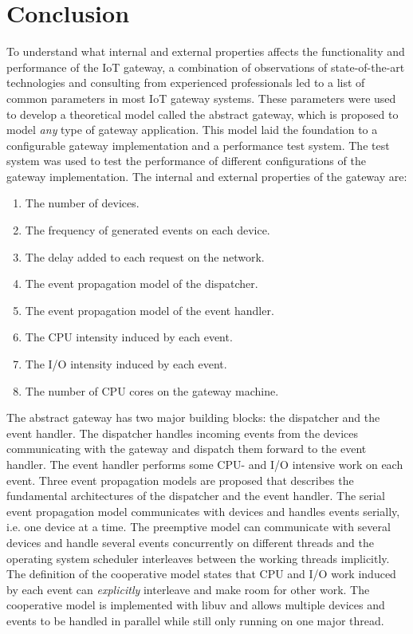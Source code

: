 \chapter{Conclusion}
\label{cha:conclusion}

To understand what internal and external properties affects the functionality
and performance of the IoT gateway, a combination of observations of
state-of-the-art technologies and consulting from experienced professionals led
to a list of common parameters in most IoT gateway systems. These parameters
were used to develop a theoretical model called the abstract gateway, which is
proposed to model \textit{any} type of gateway application. This model laid the
foundation to a configurable gateway implementation and a performance test
system. The test system was used to test the performance of different
configurations of the gateway implementation. The internal and external
properties of the gateway are:

\begin{enumerate}

    \item The number of devices.
    \item The frequency of generated events on each device.
    \item The delay added to each request on the network.
    \item The event propagation model of the dispatcher.
    \item The event propagation model of the event handler.
    \item The CPU intensity induced by each event.
    \item The I/O intensity induced by each event.
    \item The number of CPU cores on the gateway machine.

\end{enumerate}

The abstract gateway has two major building blocks: the dispatcher and the
event handler. The dispatcher handles incoming events from the devices
communicating with the gateway and dispatch them forward to the event handler.
The event handler performs some CPU- and I/O intensive work on each event.
Three event propagation models are proposed that describes the fundamental
architectures of the dispatcher and the event handler. The serial event
propagation model communicates with devices and handles events serially, i.e.
one device at a time. The preemptive model can communicate with several devices
and handle several events concurrently on different threads and the operating
system scheduler interleaves between the working threads implicitly. The
definition of the cooperative model states that CPU and I/O work induced by
each event can \textit{explicitly} interleave and make room for other work. The
cooperative model is implemented with libuv and allows multiple devices and
events to be handled in parallel while still only running on one major thread.

